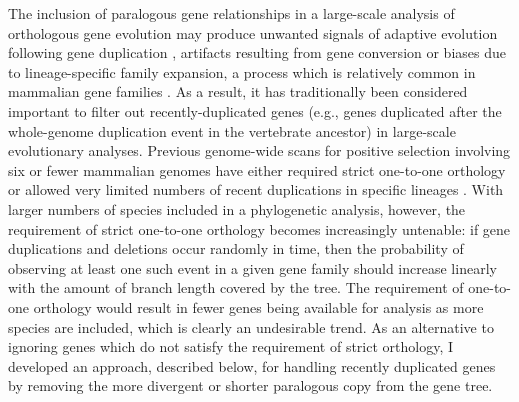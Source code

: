 The inclusion of paralogous gene relationships in a large-scale
analysis of orthologous gene evolution may produce unwanted signals of
adaptive evolution following gene duplication \citep{Lynch2000},
artifacts resulting from gene conversion \citep{Casola2009} or biases
due to lineage-specific family expansion, a process which is
relatively common in mammalian gene families \citep{Gu2002}. As a
result, it has traditionally been considered important to filter out
recently-duplicated genes (e.g., genes duplicated after the
whole-genome duplication event in the vertebrate ancestor) in
large-scale evolutionary analyses. Previous genome-wide scans for
positive selection involving six or fewer mammalian genomes have
either required strict one-to-one orthology
\citep{Clark2003,Nielsen2005} or allowed very limited numbers of
recent duplications in specific lineages \citep{Kosiol2008}. With
larger numbers of species included in a phylogenetic analysis,
however, the requirement of strict one-to-one orthology becomes
increasingly untenable: if gene duplications and deletions occur
randomly in time, then the probability of observing at least one such
event in a given gene family should increase linearly with the amount
of branch length covered by the tree. The requirement of one-to-one
orthology would result in fewer genes being available for analysis as
more species are included, which is clearly an undesirable trend. As
an alternative to ignoring genes which do not satisfy the requirement
of strict orthology, I developed an approach, described below, for
handling recently duplicated genes by removing the more divergent or
shorter paralogous copy from the gene tree.

